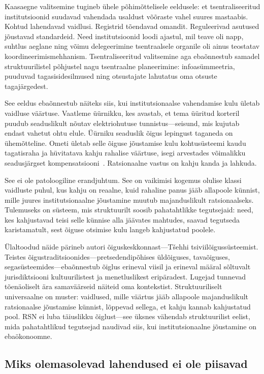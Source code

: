 \documentclass[11pt,a4paper,twocolumn]{article}
\begin{document}
Kaasaegne valitsemine tugineb ühele põhimõttelisele eeldusele: et tsentraliseeritud institutsioonid suudavad vahendada usaldust võõraste vahel suures mastaabis. Kohtud lahendavad vaidlusi. Registrid tõendavad omandit. Reguleerivad asutused jõustavad standardeid. Need institutsioonid loodi ajastul, mil teave oli napp, suhtlus aeglane ning võimu delegeerimine tsentraalsele organile oli ainus teostatav koordineerimismehhanism. Tsentraliseeritud valitsemine aga ebaõnnestub samadel struktuurilistel põhjustel nagu tsentraalne planeerimine: infoasümmeetria, puuduvad tagasisidesilmused ning otsustajate lahutatus oma otsuste tagajärgedest.

See eeldus ebaõnnestub näiteks siis, kui institutsionaalse vahendamise kulu ületab vaidluse väärtuse. Vaatleme üürnikku, kes avastab, et tema üüritud korteril puudub seaduslikult nõutav elektriohutuse tunnistus---seisund, mis kujutab endast vahetut ohtu elule. Üürniku seaduslik õigus lepingust taganeda on ühemõtteline. Ometi ületab selle õiguse jõustamise kulu kohtusüsteemi kaudu tagatisraha ja hüvitatava kahju rahalise väärtuse, isegi arvestades võimalikku seadusjärgset kompensatsiooni~\cite{czcourtfees}. Ratsionaalne vastus on kahju kanda ja lahkuda.

See ei ole patoloogiline erandjuhtum. See on vaikimisi kogemus olulise klassi vaidluste puhul, kus kahju on reaalne, kuid rahaline panus jääb allapoole künnist, mille juures institutsionaalne jõustamine muutub majanduslikult ratsionaalseks. Tulemuseks on süsteem, mis struktuurilt soosib pahatahtlikke tegutsejaid: need, kes kahjustavad teisi selle künnise alla jäävates mahtudes, saavad tegutseda karistamatult, sest õiguse otsimise kulu langeb kahjustatud poolele.

Ülaltoodud näide pärineb autori õiguskeskkonnast---Tšehhi tsiviilõigussüsteemist. Teistes õigustraditsioonides---pretsedendipõhises üldõiguses, tavaõiguses, segasüsteemides---ebaõnnestub õiglus erineval viisil ja erineval määral sõltuvalt jurisdiktsiooni kultuurilistest ja menetluslikest eripäradest. Lugejad tunnevad tõenäoliselt ära samaväärseid näiteid oma kontekstist. Struktuuriliselt universaalne on muster: vaidlused, mille väärtus jääb allapoole majanduslikult ratsionaalse jõustamise künnist, lõppevad sellega, et kahju kannab kahjustatud pool. RSN ei luba täiuslikku õiglust---see üksnes vähendab struktuurilist eelist, mida pahatahtlikud tegutsejad naudivad siis, kui institutsionaalne jõustamine on ebaökonoomne.

\subsection{Miks olemasolevad lahendused ei ole piisavad}
\end{document}
